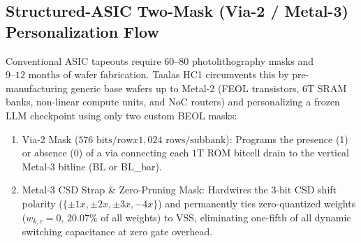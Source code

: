 \documentclass[10pt,journal,compsoc]{IEEEtran}
\def\texttt#1{#1}%
\def\textbf#1{#1}%
\def\times{x}%
\begin{document}
\subsection{Structured-ASIC Two-Mask (\texttt{Via-2} / \texttt{Metal-3}) Personalization Flow}
Conventional ASIC tapeouts require $60\text{--}80$ photolithography masks and $9\text{--}12\text{ months}$ of wafer fabrication. Taalas HC1 circumvents this by pre-manufacturing generic base wafers up to \texttt{Metal-2} (FEOL transistors, $6\text{T}$ SRAM banks, non-linear compute units, and NoC routers) and personalizing a frozen LLM checkpoint using only \textbf{two custom BEOL masks}:
\begin{enumerate}
    \item \textbf{\texttt{Via-2} Mask ($576\text{ bits/row} \times 1,024\text{ rows/subbank}$)}: Programs the presence (\texttt{1}) or absence (\texttt{0}) of a via connecting each $1\text{T}$ ROM bitcell drain to the vertical \texttt{Metal-3} bitline (\texttt{BL} or \texttt{BL\_bar}).
    \item \textbf{\texttt{Metal-3} CSD Strap \& Zero-Pruning Mask}: Hardwires the $3\text{-bit}$ CSD shift polarity ($\{\pm 1\times, \pm 2\times, \pm 3\times, -4\times\}$) and permanently ties zero-quantized weights ($w_{k,c}=0$, $\mathbf{20.07\%}$ of all weights) to \texttt{VSS}, eliminating one-fifth of all dynamic switching capacitance at zero gate overhead.
\end{enumerate}
\end{document}
